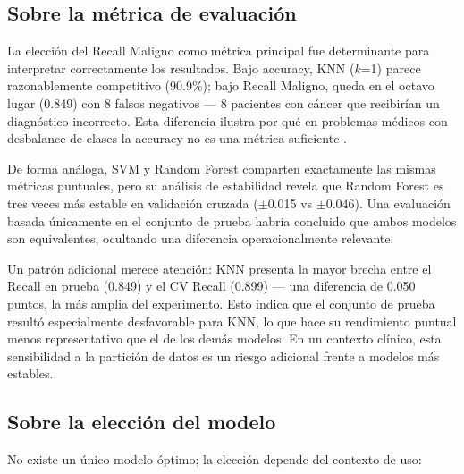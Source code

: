 \documentclass[journal]{IEEEtran}
\begin{document}
\subsection{Sobre la métrica de evaluación}
La elección del Recall Maligno como métrica principal fue
determinante para interpretar correctamente los resultados.
Bajo accuracy, KNN ($k$=1) parece razonablemente competitivo
(90.9\%); bajo Recall Maligno, queda en el octavo lugar
(0.849) con 8 falsos negativos — 8 pacientes con cáncer que
recibirían un diagnóstico incorrecto. Esta diferencia ilustra
por qué en problemas médicos con desbalance de clases la
accuracy no es una métrica suficiente \cite{hossin2015, sokolova2009}.

De forma análoga, SVM y Random Forest comparten exactamente
las mismas métricas puntuales, pero su análisis de estabilidad revela que Random Forest
es tres veces más estable en validación cruzada
($\pm$0.015 vs $\pm$0.046). Una evaluación basada únicamente
en el conjunto de prueba habría concluido que ambos modelos
son equivalentes, ocultando una diferencia operacionalmente
relevante.

Un patrón adicional merece atención: KNN presenta la mayor
brecha entre el Recall en prueba (0.849) y el CV Recall (0.899)
— una diferencia de 0.050 puntos, la más amplia del experimento.
Esto indica que el conjunto de prueba resultó especialmente
desfavorable para KNN, lo que hace su rendimiento puntual
menos representativo que el de los demás modelos. En un
contexto clínico, esta sensibilidad a la partición de datos
es un riesgo adicional frente a modelos más estables.

\subsection{Sobre la elección del modelo}
No existe un único modelo óptimo; la elección depende del
contexto de uso:
\end{document}
